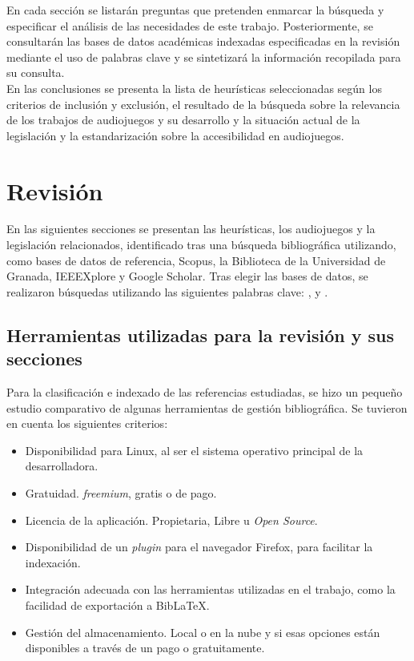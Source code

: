 En cada sección se listarán preguntas que pretenden enmarcar la búsqueda y especificar el análisis de las necesidades de este trabajo. Posteriormente, se consultarán las bases de datos académicas indexadas especificadas en la revisión mediante el uso de palabras clave y se sintetizará la información recopilada para su consulta.\\

En las conclusiones se presenta la lista de heurísticas seleccionadas según los criterios de inclusión y exclusión, el resultado de la búsqueda sobre la relevancia de los trabajos de audiojuegos y su desarrollo y la situación actual de la legislación y la estandarización sobre la accesibilidad en audiojuegos.\\

\section{Revisión}

 En las siguientes secciones se presentan las heurísticas, los audiojuegos y la legislación relacionados, identificado tras una búsqueda bibliográfica utilizando, como bases de datos de referencia, Scopus, la Biblioteca de la Universidad de Granada, IEEEXplore y Google Scholar. %
 Tras elegir las bases de datos, se realizaron búsquedas utilizando las siguientes palabras clave: ,  y .
 
 \subsection{Herramientas utilizadas para la revisión y sus secciones}
 
 Para la clasificación e indexado de las referencias estudiadas, se hizo un pequeño estudio comparativo de algunas herramientas de gestión bibliográfica. Se tuvieron en cuenta los siguientes criterios:
 \begin{itemize}
 	\item Disponibilidad para Linux, al ser el sistema operativo principal de la desarrolladora.
 	\item Gratuidad. \textit{freemium}, gratis o de pago. 
 	\item Licencia de la aplicación. Propietaria, Libre u \textit{Open Source}.
 	\item Disponibilidad de un \textit{plugin} para el navegador Firefox, para facilitar la indexación.
 	\item Integración adecuada con las herramientas utilizadas en el trabajo, como la facilidad de exportación a BibLaTeX.
 	\item Gestión del almacenamiento. Local o en la nube y si esas opciones están disponibles a través de un pago o gratuitamente.
 \end{itemize}

